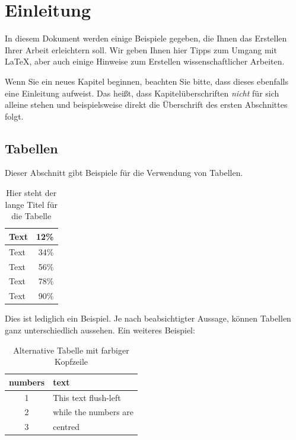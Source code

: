 \chapter{Einleitung}
\label{cha:Einleitung}

In diesem Dokument werden einige Beispiele gegeben, die Ihnen das Erstellen Ihrer Arbeit erleichtern soll. Wir geben Ihnen hier Tipps zum Umgang mit \LaTeX, aber auch einige Hinweise zum Erstellen wissenschaftlicher Arbeiten. 

Wenn Sie ein neues Kapitel beginnen, beachten Sie bitte, dass dieses ebenfalls eine Einleitung aufweist. Das heißt, dass Kapitelüberschriften \textit{nicht} für sich alleine stehen und beispielsweise direkt die Überschrift des ersten Abschnittes folgt.


\section{Tabellen}
\label{sec:Tabellen}
Dieser Abschnitt gibt Beispiele für die Verwendung von Tabellen.

\begin{table}[ht]
	\centering
    \caption[Kurztitel Tabelle]{Hier steht der lange Titel für die Tabelle}
    \vspace{1.0em}	
	\begin{tabular}{|l|r|}
\hline
Text & 12\% \\
\hline
Text & 34\% \\
\hline
Text & 56\% \\
\hline
Text & 78\% \\
\hline
Text & 90\% \\
\hline
		\end{tabular}
	\vspace{1.0em}
	\label{tab:tabelle}
\end{table}

\noindent{}Dies ist lediglich ein Beispiel. Je nach beabsichtigter Aussage, können Tabellen ganz unterschiedlich aussehen. Ein weiteres Beispiel:

\begin{table}[ht]
	\centering
	\caption[Alternative Tabelle]{Alternative Tabelle mit farbiger Kopfzeile}
		\vspace{1.0em}	
	\begin{tabular}{|c|l|}
		\hline
		\rowcolor[gray]{0.9}\textbf{numbers} & \textbf{text} \\
		\hline
		\hline
		1 & This text flush-left \\
		\hline
		2 & while the numbers are \\
		\hline
		3 & centred \\
		\hline
	\end{tabular}
	\label{tab:tablealternative}
\end{table}

